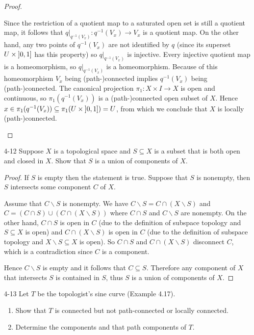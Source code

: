 \begin{proof}
\begin{enumerate}[label={(\alph*)}]
		      Since the restriction of a quotient map to a saturated open set is still a quotient map, it follows that $q\vert_{q^{-1}(V_{x})}: q^{-1}(V_{x}) \to V_{x}$ is a quotient map. On the other hand, any two points of $q^{-1}(V_{x})$ are not identified by $q$ (since its superset $U\times\left]{0,1}\right]$ has this property) so $q\vert_{q^{-1}(V_{x})}$ is injective. Every injective quotient map is a homeomorphism, so $q\vert_{q^{-1}(V_{x})}$ is a homeomorphism. Because of this homeomorphism $V_{x}$ being {(path-)}connected implies $q^{-1}(V_{x})$ being {(path-)}connected. The canonical projection $\pi_{1}: X\times I \to X$ is open and continuous, so $\pi_{1}(q^{-1}(V_{x}))$ is a {(path-)}connected open subset of $X$. Hence $x \in \pi_{1}(q^{-1}(V_{x})) \subseteq \pi_{1}(U\times\left]{0,1}\right]) = U$, from which we conclude that $X$ is locally {(path-)}connected.
	\end{enumerate}
\end{proof}

\begin{problem}{4-12}
Suppose $X$ is a topological space and $S\subseteq X$ is a subset that is both open and closed in $X$. Show that $S$ is a union of components of $X$.
\end{problem}

\begin{proof}
	If $S$ is empty then the statement is true. Suppose that $S$ is nonempty, then $S$ intersects some component $C$ of $X$.

	Assume that $C\smallsetminus S$ is nonempty. We have $C\smallsetminus S = C\cap (X\smallsetminus S)$ and $C = (C\cap S) \cup (C\cap (X\smallsetminus S))$ where $C\cap S$ and $C\smallsetminus S$ are nonempty. On the other hand, $C\cap S$ is open in $C$ (due to the definition of subspace topology and $S\subseteq X$ is open) and $C\cap (X\smallsetminus S)$ is open in $C$ (due to the  definition of subspace topology and $X\smallsetminus S \subseteq X$ is open). So $C\cap S$ and $C\cap (X\smallsetminus S)$ disconnect $C$, which is a contradiction since $C$ is a component.

	Hence $C\smallsetminus S$ is empty and it follows that $C\subseteq S$. Therefore any component of $X$ that intersects $S$ is contained in $S$, thus $S$ is a union of components of $X$.
\end{proof}

\begin{problem}{4-13}\label{problem:4-13}
Let $T$ be the topologist's sine curve (Example 4.17).
\begin{enumerate}[label={(\alph*)}]
	\item Show that $T$ is connected but not path-connected or locally connected.
	\item Determine the components and that path components of $T$.
\end{enumerate}
\end{problem}

